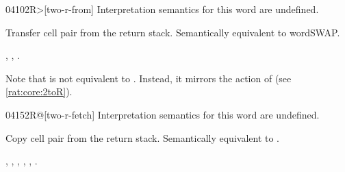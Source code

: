 \begin{worddef}[2Rfrom]{0410}{2R>}[two-r-from]
\interpret
	Interpretation semantics for this word are undefined.

\execute

	Transfer cell pair  from the return stack.
	Semantically equivalent to   word{SWAP}.

\see {},
	,
	.

	\begin{defer}
	\rationale %
		Note that  is not equivalent to  .
		Instead, it mirrors the action of 
		(see \ref{rat:core:2toR}).
	\end{defer}
\end{worddef}


\begin{worddef}{0415}{2R@}[two-r-fetch]
\interpret
	Interpretation semantics for this word are undefined.

\execute

	Copy cell pair  from the return stack.
	Semantically equivalent to   
	  .

\see {},
	,
	,
	,
	,
	.
\end{worddef}


